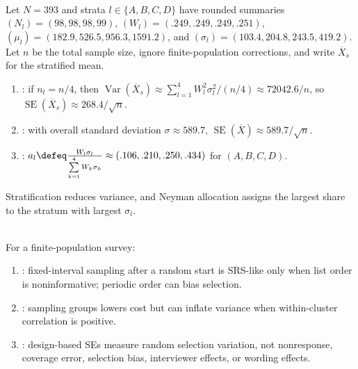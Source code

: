\begin{example} \label{ex:four-stratum-stratification-summary} \\
Let $N=393$ and strata $l\in\{A,B,C,D\}$ have rounded summaries $(N_l)=(98,98,98,99)$, $(W_l)=(.249,.249,.249,.251)$, $(\mu_l)=(182.9,526.5,956.3,1591.2)$, and $(\sigma_l)=(103.4,204.8,243.5,419.2)$. Let $n$ be the total sample size, ignore finite-population corrections, and write $\overline{X}_s$ for the stratified mean.
\begin{enumerate}[label=(\roman*)]
\setlength{\itemsep}{0pt}
\item {}: if $n_l=n/4$, then $\operatorname{Var}(\overline{X}_s)\approx\sum\limits_{l=1}^{4}W_l^2\sigma_l^2/(n/4)\approx72042.6/n$, so $\operatorname{SE}(\overline{X}_s)\approx268.4/\sqrt n$.
\item {}: with overall standard deviation $\sigma\approx589.7$, $\operatorname{SE}(\overline{X})\approx589.7/\sqrt n$.
\item {}: $a_l\defeq\frac{W_l\sigma_l}{\sum\limits_{k=1}^{4}W_k\sigma_k}\approx(.106,.210,.250,.434)$ for $(A,B,C,D)$.
\end{enumerate}
Stratification reduces variance, and Neyman allocation assigns the largest share to the stratum with largest $\sigma_l$.
\end{example}

\begin{remark} \label{rem:survey-sampling-model-limitations} \\
For a finite-population survey:
\begin{enumerate}[label=(\roman*)]
\setlength{\itemsep}{0pt}
\item {}: fixed-interval sampling after a random start is SRS-like only when list order is noninformative; periodic order can bias selection.
\item {}: sampling groups lowers cost but can inflate variance when within-cluster correlation is positive.
\item {}: design-based SEs measure random selection variation, not nonresponse, coverage error, selection bias, interviewer effects, or wording effects.
\end{enumerate}
\end{remark}
